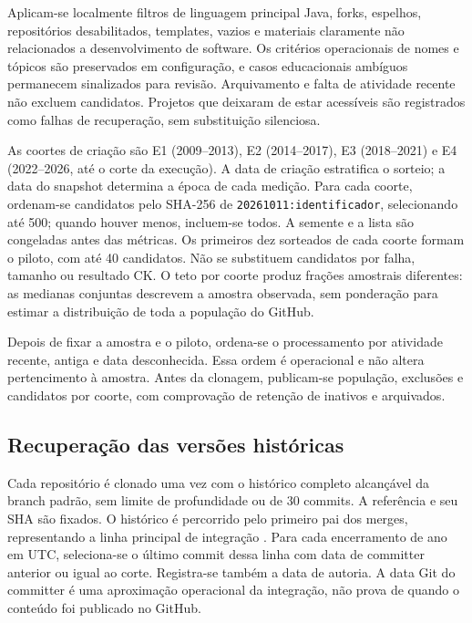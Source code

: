 Aplicam-se localmente filtros de linguagem principal Java, forks, espelhos, repositórios desabilitados, templates, vazios e materiais claramente não relacionados a desenvolvimento de software. Os critérios operacionais de nomes e tópicos são preservados em configuração, e casos educacionais ambíguos permanecem sinalizados para revisão. Arquivamento e falta de atividade recente não excluem candidatos. Projetos que deixaram de estar acessíveis são registrados como falhas de recuperação, sem substituição silenciosa.

As coortes de criação são E1 (2009--2013), E2 (2014--2017), E3 (2018--2021) e E4 (2022--2026, até o corte da execução). A data de criação estratifica o sorteio; a data do snapshot determina a época de cada medição. Para cada coorte, ordenam-se candidatos pelo SHA-256 de \texttt{20261011:identificador}, selecionando até 500; quando houver menos, incluem-se todos. A semente e a lista são congeladas antes das métricas. Os primeiros dez sorteados de cada coorte formam o piloto, com até 40 candidatos. Não se substituem candidatos por falha, tamanho ou resultado CK. O teto por coorte produz frações amostrais diferentes: as medianas conjuntas descrevem a amostra observada, sem ponderação para estimar a distribuição de toda a população do GitHub.

Depois de fixar a amostra e o piloto, ordena-se o processamento por atividade recente, antiga e data desconhecida. Essa ordem é operacional e não altera pertencimento à amostra. Antes da clonagem, publicam-se população, exclusões e candidatos por coorte, com comprovação de retenção de inativos e arquivados.

\subsection{Recuperação das versões históricas}
\label{subsec:snapshots}

Cada repositório é clonado uma vez com o histórico completo alcançável da branch padrão, sem limite de profundidade ou de 30 commits. A referência e seu SHA são fixados. O histórico é percorrido pelo primeiro pai dos merges, representando a linha principal de integração \cite{git:firstparent}. Para cada encerramento de ano em UTC, seleciona-se o último commit dessa linha com data de committer anterior ou igual ao corte. Registra-se também a data de autoria. A data Git do committer é uma aproximação operacional da integração, não prova de quando o conteúdo foi publicado no GitHub.


